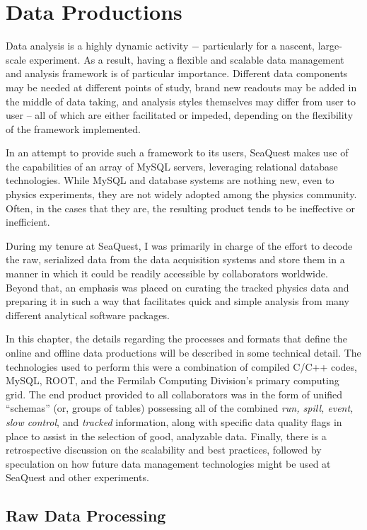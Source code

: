 \chapter{Data Productions}

Data analysis is a highly dynamic activity $-$ particularly for a nascent, large-scale experiment. As a result, having a flexible and scalable data management and analysis framework is of particular importance. Different data components may be needed at different points of study, brand new readouts may be added in the middle of data taking, and analysis styles themselves may differ from user to user -- all of which are either facilitated or impeded, depending on the flexibility of the framework implemented.

In an attempt to provide such a framework to its users, SeaQuest makes use of the capabilities of an array of MySQL servers, leveraging relational database technologies. While MySQL and database systems are nothing new, even to physics experiments, they are not widely adopted among the physics community. Often, in the cases that they are, the resulting product tends to be ineffective or inefficient. 

During my tenure at SeaQuest, I was primarily in charge of the effort to decode the raw, serialized data from the data acquisition systems and store them in a manner in which it could be readily accessible by collaborators worldwide. Beyond that, an emphasis was placed on curating the tracked physics data and preparing it in such a way that facilitates quick and simple analysis from many different analytical software packages. 

In this chapter, the details regarding the processes and formats that define the online and offline data productions will be described in some technical detail. The technologies used to perform this were a combination of compiled C/C++ codes, MySQL, ROOT, and the Fermilab Computing Division's primary computing grid. The end product provided to all collaborators was in the form of unified ``schemas'' (or, groups of tables) possessing all of the combined \emph{run, spill, event, slow control}, and \emph{tracked} information, along with specific data quality flags in place to assist in the selection of good, analyzable data. Finally, there is a retrospective discussion on the scalability and best practices, followed by speculation on how future data management technologies might be used at SeaQuest and other experiments.

\section{Raw Data Processing}

